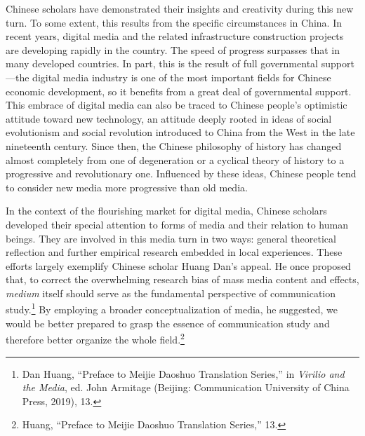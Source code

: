 \documentclass{tufte-handout}
\begin{document}
Chinese scholars have demonstrated their insights and creativity during
this new turn. To some extent, this results from the specific
circumstances in China. In recent years, digital media and the related
infrastructure construction projects are developing rapidly in the
country. The speed of progress surpasses that in many developed
countries. In part, this is the result of full governmental
support---the digital media industry is one of the most important fields
for Chinese economic development, so it benefits from a great deal of
governmental support. This embrace of digital media can also be traced
to Chinese people's optimistic attitude toward new technology, an
attitude deeply rooted in ideas of social evolutionism and social
revolution introduced to China from the West in the late nineteenth
century. Since then, the Chinese philosophy of history has changed
almost completely from one of degeneration or a cyclical theory of
history to a progressive and revolutionary one. Influenced by these
ideas, Chinese people tend to consider new media more progressive than
old media.

In the context of the flourishing market for digital media, Chinese
scholars developed their special attention to forms of media and their
relation to human beings. They are involved in this media turn in two
ways: general theoretical reflection and further empirical research
embedded in local experiences. These efforts largely exemplify Chinese
scholar Huang Dan's appeal. He once proposed that, to correct the
overwhelming research bias of mass media content and effects,
\emph{medium} itself should serve as the fundamental perspective of
communication study.\footnote{Dan Huang, ``Preface to Meijie Daoshuo
  Translation Series,'' in \emph{Virilio and the Media}, ed. John
  Armitage (Beijing: Communication University of China Press, 2019), 13.}
By employing a broader conceptualization of media, he suggested, we
would be better prepared to grasp the essence of communication study and
therefore better organize the whole field.\footnote{Huang, ``Preface to
  Meijie Daoshuo Translation Series,'' 13.}
\end{document}
